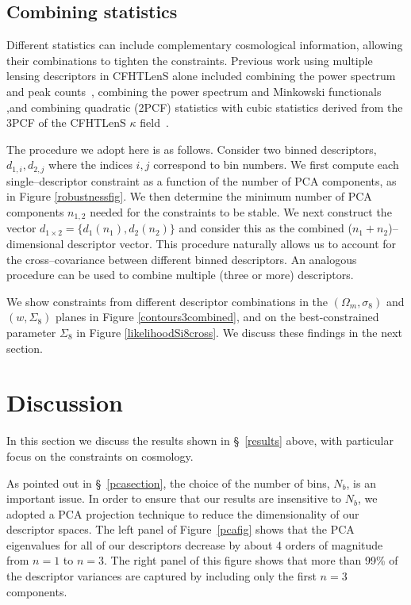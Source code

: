 \documentclass[reprint,aps,prd,superscriptaddress,showkeys,showpacs]{revtex4-1}
\begin{document}
\subsection{Combining statistics}

Different statistics can include complementary cosmological
information, allowing their combinations to tighten the
constraints. Previous work using multiple lensing descriptors in
CFHTLenS alone included combining the power spectrum and peak
counts~\citep{Companion}, combining the power spectrum and Minkowski functionals ~\citep{CFHTMasato} ,and combining quadratic (2PCF) statistics
with cubic statistics derived from the 3PCF of the CFHTLenS $\kappa$ field~\citep{CFHTFu}.

The procedure we adopt here is as follows. Consider two binned
descriptors, $d_{1,i},d_{2,j}$ where the indices $i,j$ correspond to
bin numbers.  We first compute each single--descriptor constraint as a
function of the number of PCA components, as in Figure
\ref{robustnessfig}. We then determine the minimum number of PCA
components $n_{1,2}$ needed for the constraints to be stable. We next
construct the vector $d_{1\times2} = \{d_1(n_1),d_2(n_2)\}$ and
consider this as the combined ($n_1+n_2$)--dimensional descriptor
vector. This procedure naturally allows us to account for the
cross--covariance between different binned descriptors. An analogous
procedure can be used to combine multiple (three or more)
descriptors. 


We show constraints from different descriptor combinations in the
$(\Omega_m,\sigma_8)$ and $(w,\Sigma_8)$ planes in Figure
\ref{contours3combined}, and on the best-constrained parameter
$\Sigma_8$ in Figure \ref{likelihoodSi8cross}. We discuss these
findings in the next section.



\section{Discussion}
\label{discussion}

In this section we discuss the results shown in \S~\ref{results}
above, with particular focus on the constraints on cosmology.

As pointed out in \S~\ref{pcasection}, the choice of the number of
bins, $N_b$, is an important issue. In order to ensure that our
results are insensitive to $N_b$, we adopted a PCA projection
technique to reduce the dimensionality of our descriptor spaces. The
left panel of Figure~\ref{pcafig} shows that the PCA eigenvalues for
all of our descriptors decrease by about 4 orders of magnitude from
$n=1$ to $n=3$. The right panel of this figure shows that more than
99\% of the descriptor variances are captured by including only the
first $n=3$ components.
\end{document}
